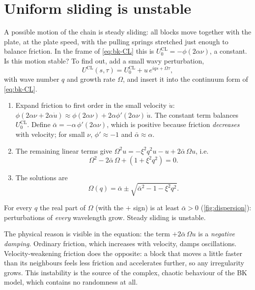 \section{Uniform sliding is unstable}
\label{sec:bk-instability}

A possible motion of the chain is steady sliding: all blocks move together with the plate, at the plate speed, with the
pulling springs stretched just enough to balance friction. In the frame of \cref{eq:bk-CL} this is $U^{\text{CL}}_0 =
-\phi(2\alpha\nu)$, a constant. Is this motion stable? To find out, add a small wavy perturbation,
\begin{equation}
  U^{\text{CL}}(s,\tau) = U^{\text{CL}}_0 + u\,e^{iqs+\Omega\tau},
\end{equation}
with wave number $q$ and growth rate $\Omega$, and insert it into the continuum form of \cref{eq:bk-CL}.
\begin{enumerate}
  \item Expand friction to first order in the small velocity $\dot u$: $\phi(2\alpha\nu + 2\alpha\dot u)\approx\phi(2\alpha\nu) +
    2\alpha\phi'(2\alpha\nu)\,\dot u$. The constant term balances $U^{\text{CL}}_0$. Define $\bar\alpha = -\alpha\,\phi'(2\alpha\nu)$,
    which is positive because friction \emph{decreases} with velocity; for small $\nu$, $\phi'\approx-1$ and $\bar\alpha\approx\alpha$.
  \item The remaining linear terms give $\Omega^2 u = -\xi^2q^2 u - u + 2\bar\alpha\,\Omega u$, i.e.
    \begin{equation}
      \Omega^2 - 2\bar\alpha\,\Omega + (1+\xi^2q^2) = 0 .
    \end{equation}
  \item The solutions are
    \begin{equation}
      \Omega(q) = \bar\alpha \pm\sqrt{\bar\alpha^2 - 1 - \xi^2q^2}.
      \label{eq:dispersion}
    \end{equation}
\end{enumerate}
For every $q$ the real part of $\Omega$ (with the $+$ sign) is at least $\bar\alpha>0$ (\cref{fig:dispersion}): perturbations of
\emph{every} wavelength grow. Steady sliding is unstable.

The physical reason is visible in the equation: the term $+2\bar\alpha\,\Omega u$ is a \emph{negative damping}. Ordinary friction,
which increases with velocity, damps oscillations. Velocity-weakening friction does the opposite: a block that moves a little faster
than its neighbours feels less friction and accelerates further, so any irregularity grows. This instability is the source of the
complex, chaotic behaviour of the BK model, which contains no randomness at all.

